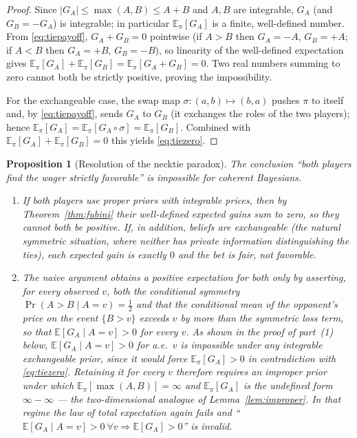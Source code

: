 \documentclass{amsart}
\theoremstyle{plain}
\newtheorem{proposition}{Proposition}
\theoremstyle{definition}
\begin{document}
\begin{proof}
Since $|G_A|\le\max(A,B)\le A+B$ and $A,B$ are integrable, $G_A$ (and
$G_B=-G_A$) is integrable; in particular $\mathbb E_\pi[G_A]$ is a finite,
well-defined number. From \eqref{eq:tiepayoff}, $G_A+G_B=0$ pointwise (if $A>B$
then $G_A=-A$, $G_B=+A$; if $A<B$ then $G_A=+B$, $G_B=-B$), so linearity of the
well-defined expectation gives
$\mathbb E_\pi[G_A]+\mathbb E_\pi[G_B]=\mathbb E_\pi[G_A+G_B]=0$. Two real numbers
summing to zero cannot both be strictly positive, proving the impossibility.

For the exchangeable case, the swap map $\sigma:(a,b)\mapsto(b,a)$ pushes $\pi$
to itself and, by \eqref{eq:tiepayoff}, sends $G_A$ to $G_B$ (it exchanges the
roles of the two players); hence
$\mathbb E_\pi[G_A]=\mathbb E_\pi[G_A\circ\sigma]=\mathbb E_\pi[G_B]$. Combined
with $\mathbb E_\pi[G_A]+\mathbb E_\pi[G_B]=0$ this yields \eqref{eq:tiezero}.
\end{proof}

\begin{proposition}[Resolution of the necktie paradox]\label{prop:tie}
The conclusion ``both players find the wager strictly favorable'' is impossible
for coherent Bayesians.
\begin{enumerate}
\item If both players use proper priors with integrable prices, then by
Theorem~\ref{thm:fubini} their well-defined expected gains sum to zero, so they
cannot both be positive. If, in addition, beliefs are exchangeable (the natural
symmetric situation, where neither has private information distinguishing the
ties), each expected gain is exactly $0$ and the bet is fair, not favorable.
\item The naive argument obtains a positive expectation for both only by
asserting, for every observed $v$, both the conditional symmetry
$\Pr(A>B\mid A=v)=\tfrac12$ \emph{and} that the conditional mean of the
opponent's price on the event $\{B>v\}$ exceeds $v$ by more than the symmetric
loss term, so that $\mathbb E[G_A\mid A=v]>0$ for every $v$. As shown in the
proof of part~(1) below, $\mathbb E[G_A\mid A=v]>0$ for a.e.\ $v$ is impossible
under any integrable exchangeable prior, since it would force
$\mathbb E_\pi[G_A]>0$ in contradiction with \eqref{eq:tiezero}. Retaining it for
every $v$ therefore requires an improper prior under which
$\mathbb E_\pi[\max(A,B)]=\infty$ and $\mathbb E_\pi[G_A]$ is the undefined form
$\infty-\infty$ --- the two-dimensional analogue of Lemma~\ref{lem:improper}. In
that regime the law of total expectation again
fails and ``$\mathbb E[G_A\mid A=v]>0\ \forall v \Rightarrow \mathbb E[G_A]>0$''
is invalid.
\end{enumerate}
\end{proposition}
\end{document}
